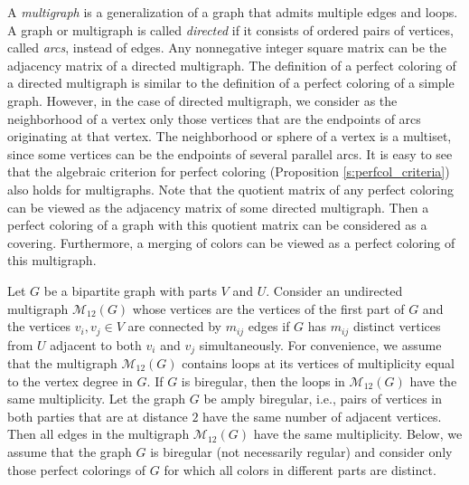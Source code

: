 \documentclass[11pt]{article}
\theoremstyle{definition}
\begin{document}
{{{A {\sl multigraph} is a generalization  of a graph that admits multiple
edges and loops.
A graph or multigraph is called {\sl directed} if it consists of  ordered pairs of  vertices,  called {\sl arcs},   instead of edges.
 Any nonnegative integer square matrix  can be  the adjacency matrix of a directed multigraph.
The definition of a perfect coloring of a directed multigraph
is similar to the definition of a perfect coloring of a simple graph. However, in the case of directed multigraph, we consider as the neighborhood of a vertex  only those
vertices that are the endpoints of arcs originating at that vertex. The neighborhood or sphere of a vertex is a multiset, since some vertices can be the endpoints of several parallel arcs.  It is easy to see that the algebraic criterion
for  perfect coloring (Proposition \ref{s:perfcol_criteria}) also holds for multigraphs. Note that the quotient matrix of any perfect
coloring can be viewed as the adjacency matrix of some
directed multigraph. Then a perfect coloring of a graph with
this quotient matrix can be considered as a covering. Furthermore, a merging of colors  can be viewed as a
perfect coloring of this multigraph.

Let $G$ be a bipartite graph with parts $V$ and $U$. Consider an undirected multigraph $\mathcal{M}_{12}(G)$ whose vertices
are the vertices of the first part of $G$ and the vertices
$v_i,v_j\in V$ are connected by $m_{ij}$ edges if $G$ has
$m_{ij}$ distinct vertices from $U$ adjacent to both $v_i$ and $v_j$
simultaneously. For convenience, we assume that the multigraph $\mathcal{M}_{12}(G)$ contains loops at its vertices
of multiplicity equal to the vertex degree in $G$. If $G$ is biregular,
then the loops in $\mathcal{M}_{12}(G)$ have the same multiplicity. Let
the graph $G$ be amply biregular, i.e., pairs of vertices in both
parties that are at distance $2$ have the same number of adjacent vertices. Then all edges in the multigraph $\mathcal{M}_{12}(G)$ have the same multiplicity. 
Below, we assume that the graph $G$
is biregular (not necessarily regular) and consider only those perfect colorings of $G$ for which all colors in different
parts are distinct.

}}}
\end{document}
